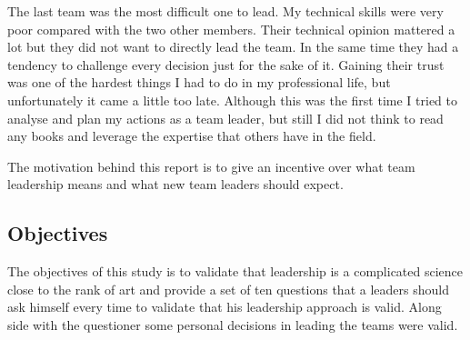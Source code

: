 The last team was the most difficult one to lead. My technical skills were very poor compared with the two other members. Their technical opinion mattered a lot but they did not want to directly lead the team. In the same time they had a tendency to challenge every decision just for the sake of it. Gaining their trust was one of the hardest things I had to do in my professional life, but unfortunately it came a little too late. Although this was the first time I tried to analyse and plan my actions as a team leader, but still I did not think to read any books and leverage the expertise that others have in the field.

The motivation behind this report is to give an incentive over what team leadership means and what new team leaders should expect.

\subsection{Objectives}
\label{sub-sec:objectives}

The objectives of this study is to validate that leadership is a complicated science close to the rank of art and provide a set of ten questions that a leaders should ask himself every time to validate that his leadership approach is valid. 
Along side with the questioner some personal decisions in leading the teams were valid.